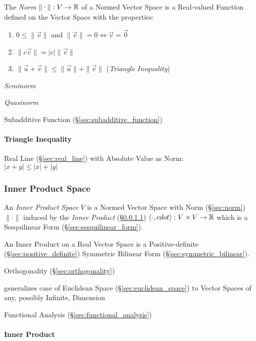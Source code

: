 The \emph{Norm} $\|\cdot\| : V \rightarrow \mathbb{R}$ of a Normed Vector Space is
a Real-valued Function defined on the Vector Space with the properties:
\begin{enumerate}
  \item $0 \leq \|\vec{v}\|$ and
    $\|\vec{v}\| = 0 \Leftrightarrow \vec{v} = \vec{0}$
  \item $\|c\vec{v}\| = |c|\|\vec{v}\|$
  \item $\|\vec{u} + \vec{v}\| \leq \|\vec{u}\| + \|\vec{v}\|$ (\emph{Triangle
    Inequality})
\end{enumerate}

\emph{Seminorm}

\emph{Quasinorm}

Subadditive Function (\S\ref{sec:subadditive_function})



\paragraph{Triangle Inequality}\label{sec:triangle_inequality}\hfill

Real Line (\S\ref{sec:real_line}) with Absolute Value as Norm:\\
$|x + y| \leq |x| + |y|$



\subsubsection{Inner Product Space}\label{sec:innerproduct_space}

An \emph{Inner Product Space} $V$ is a Normed Vector Space with Norm
(\S\ref{sec:norm}) $\|\cdot\|$ induced by the \emph{Inner Product}
(\S\ref{sec:inner_product}) $\langle{\cdot,cdot}\rangle : V \times V
\rightarrow \mathbb{R}$ which is a Sesquilinear Form
(\S\ref{sec:sesquilinear_form}).

An Inner Product on a Real Vector Space is a Positive-definite
(\S\ref{sec:positive_definite}) Symmetric Bilinear Form
(\S\ref{sec:symmetric_bilinear}).

\fist Orthogonality (\S\ref{sec:orthogonality})

generalizes case of Euclidean Space (\S\ref{sec:euclidean_space}) to
Vector Spaces of any, possibly Infinite, Dimension

Functional Analysis (\S\ref{sec:functional_analysis})



\paragraph{Inner Product}\label{sec:inner_product}\hfill

